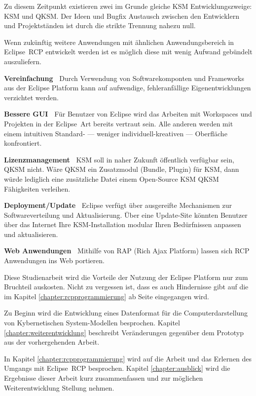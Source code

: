\documentclass[%
12pt,titlepage,abstracton]{scrreprt}
\begin{document}
Zu diesem Zeitpunkt existieren zwei im Grunde gleiche KSM Entwicklungszweige:
KSM und QKSM. Der Ideen und Bugfix Austausch zwischen den Entwicklern und
Projektständen ist durch die strikte Trennung nahezu null.

Wenn zukünftig weitere Anwendungen mit ähnlichen Anwendungsbereich in
Eclipse~RCP entwickelt werden ist es möglich diese mit wenig Aufwand gebündelt
auszuliefern.

\textbf{Vereinfachung\ } Durch Verwendung von Softwarekomponten und Frameworks
aus der Eclipse Platform kann auf aufwendige, fehleranfällige Eigenentwicklungen
verzichtet werden.

\textbf{Bessere GUI\ } Für Benutzer von Eclipse wird das Arbeiten mit
Workspaces und Projekten in der Eclipse~Art bereits vertraut sein. Alle anderen
werden mit einem intuitiven Standard- --- weniger individuell-kreativen ---
Oberfläche konfrontiert.

\textbf{Lizenzmanagement\ } KSM soll in naher Zukunft öffentlich verfügbar
sein, QKSM nicht. Wäre QKSM ein Zusatzmodul (Bundle, Plugin) für KSM, dann
würde lediglich eine zusätzliche Datei einem Open-Source KSM QKSM Fähigkeiten
verleihen.

\textbf{Deployment/Update\ } Eclipse verfügt über ausgereifte Mechanismen zur
Softwareverteilung und Aktualisierung. Über eine Update-Site könnten Benutzer
über das Internet Ihre KSM-Installation modular Ihren Bedürfnissen anpassen und
aktualisieren.

\textbf{Web Anwendungen\ } Mithilfe von RAP (Rich Ajax Platform) lassen sich
RCP Anwendungen ins Web portieren.

\vspace{1cm}

Diese Studienarbeit wird die Vorteile der Nutzung der Eclipse Platform nur zum
Bruchteil auskosten. Nicht zu vergessen ist, dass es auch Hindernisse gibt auf
die im Kapitel \ref{chapter:rcpprogrammierung} ab Seite
\pageref{chapter:rcpprogrammierung} eingegangen wird.

Zu Beginn wird die Entwicklung eines Datenformat für die Computerdarstellung von
Kybernetischen System-Modellen besprochen. Kapitel
\ref{chapter:weiterentwicklung} beschreibt Veränderungen gegenüber dem Prototyp
aus der vorhergehenden Arbeit.

In Kapitel \ref{chapter:rcpprogrammierung} wird auf die Arbeit und das
Erlernen des Umgangs mit Eclipse~RCP besprochen. Kapitel \ref{chapter:ausblick}
wird die Ergebnisse dieser Arbeit kurz zusammenfassen und zur möglichen
Weiterentwicklung Stellung nehmen.
\end{document}
